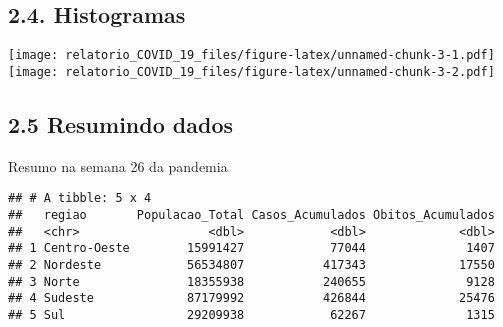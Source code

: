 \documentclass[
]{article}
\begin{document}
\subsection{2.4. Histogramas}\label{histogramas}

\texttt{[image: relatorio\_COVID\_19\_files/figure-latex/unnamed-chunk-3-1.pdf]}
\texttt{[image: relatorio\_COVID\_19\_files/figure-latex/unnamed-chunk-3-2.pdf]}

\subsection{2.5 Resumindo dados}\label{resumindo-dados}

Resumo na semana 26 da pandemia

\begin{verbatim}
## # A tibble: 5 x 4
##   regiao       Populacao_Total Casos_Acumulados Obitos_Acumulados
##   <chr>                  <dbl>            <dbl>             <dbl>
## 1 Centro-Oeste        15991427            77044              1407
## 2 Nordeste            56534807           417343             17550
## 3 Norte               18355938           240655              9128
## 4 Sudeste             87179992           426844             25476
## 5 Sul                 29209938            62267              1315
\end{verbatim}
\end{document}
